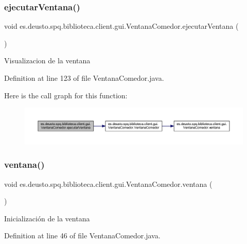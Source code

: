 \subsubsection{\texorpdfstring{ejecutar\+Ventana()}{ejecutarVentana()}}
{\footnotesize\ttfamily void es.\+deusto.\+spq.\+biblioteca.\+client.\+gui.\+Ventana\+Comedor.\+ejecutar\+Ventana (\begin{DoxyParamCaption}{ }\end{DoxyParamCaption})}

Visualizacion de la ventana 

Definition at line 123 of file Ventana\+Comedor.\+java.

Here is the call graph for this function\+:
\nopagebreak
\begin{figure}[H]
\begin{center}
\leavevmode
\includegraphics[width=350pt]{classes_1_1deusto_1_1spq_1_1biblioteca_1_1client_1_1gui_1_1_ventana_comedor_afd75ec87658a9f0ebb4a77e48de601f8_cgraph}
\end{center}
\end{figure}
\mbox{\label{classes_1_1deusto_1_1spq_1_1biblioteca_1_1client_1_1gui_1_1_ventana_comedor_a5fccdea48f9951fe483c0ace7ef475e0}} 
\subsubsection{\texorpdfstring{ventana()}{ventana()}}
{\footnotesize\ttfamily void es.\+deusto.\+spq.\+biblioteca.\+client.\+gui.\+Ventana\+Comedor.\+ventana (\begin{DoxyParamCaption}{ }\end{DoxyParamCaption})}

Inicialización de la ventana 

Definition at line 46 of file Ventana\+Comedor.\+java.

